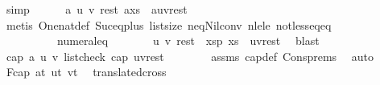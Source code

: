 \begin{isabellebody}
\ simp\isanewline
\ \ \ \ \isamarkupfalse%
\ {\isachardoublequoteopen}{\isasymexists}a\ u\ v\ rest{\isachardot}{\kern0pt}\ {\isacharparenleft}{\kern0pt}a{\isacharhash}{\kern0pt}xs{\isacharparenright}{\kern0pt}\ {\isacharequal}{\kern0pt}\ {\isacharparenleft}{\kern0pt}a{\isacharhash}{\kern0pt}u{\isacharhash}{\kern0pt}v{\isacharhash}{\kern0pt}rest{\isacharparenright}{\kern0pt}{\isachardoublequoteclose}\isanewline
\ \ \ \ \ \ \isamarkupfalse%
\ {\isacharparenleft}{\kern0pt}metis\ One{\isacharunderscore}{\kern0pt}nat{\isacharunderscore}{\kern0pt}def\ Suc{\isacharunderscore}{\kern0pt}eq{\isacharunderscore}{\kern0pt}plus{}\ list{\isachardot}{\kern0pt}size{\isacharparenleft}{\kern0pt}{}{\isacharcomma}{\kern0pt}{}{\isacharparenright}{\kern0pt}\ neq{\isacharunderscore}{\kern0pt}Nil{\isacharunderscore}{\kern0pt}conv\ nle{\isacharunderscore}{\kern0pt}le\ not{\isacharunderscore}{\kern0pt}less{\isacharunderscore}{\kern0pt}eq{\isacharunderscore}{\kern0pt}eq\isanewline
\ \ \ \ \ \ \ \ \ \ numeral{\isacharunderscore}{\kern0pt}{}{\isacharunderscore}{\kern0pt}eq{\isacharunderscore}{\kern0pt}{}{\isacharparenright}{\kern0pt}\isanewline
\ \ \ \ \isamarkupfalse%
\ \isamarkupfalse%
\ u\ v\ rest\ \ xsp{\isacharcolon}{\kern0pt}\ {\isachardoublequoteopen}xs\ {\isacharequal}{\kern0pt}\ u{\isacharhash}{\kern0pt}v{\isacharhash}{\kern0pt}rest{\isachardoublequoteclose}\ \isamarkupfalse%
\ blast\isanewline
\ \ \ \ \isamarkupfalse%
\ {\isachardoublequoteopen}cap{}\ a\ u\ v{\isachardoublequoteclose}\ {\isachardoublequoteopen}list{\isacharunderscore}{\kern0pt}check\ cap{}\ {\isacharparenleft}{\kern0pt}u{\isacharhash}{\kern0pt}v{\isacharhash}{\kern0pt}rest{\isacharparenright}{\kern0pt}{\isachardoublequoteclose}\isanewline
\ \ \ \ \ \ \isamarkupfalse%
\ assms\ cap{\isacharunderscore}{\kern0pt}def\ Cons{\isachardot}{\kern0pt}prems\ \isamarkupfalse%
\ auto\isanewline
\ \ \ \ \isamarkupfalse%
\ F{}{\isacharcolon}{\kern0pt}{\isachardoublequoteopen}cap{}\ {\isacharparenleft}{\kern0pt}a{\isacharplus}{\kern0pt}t{\isacharparenright}{\kern0pt}\ {\isacharparenleft}{\kern0pt}u{\isacharplus}{\kern0pt}t{\isacharparenright}{\kern0pt}\ {\isacharparenleft}{\kern0pt}v{\isacharplus}{\kern0pt}t{\isacharparenright}{\kern0pt}{\isachardoublequoteclose}\ \isamarkupfalse%
\ translated{\isacharunderscore}{\kern0pt}cross{}\isanewline

\end{isabellebody}

